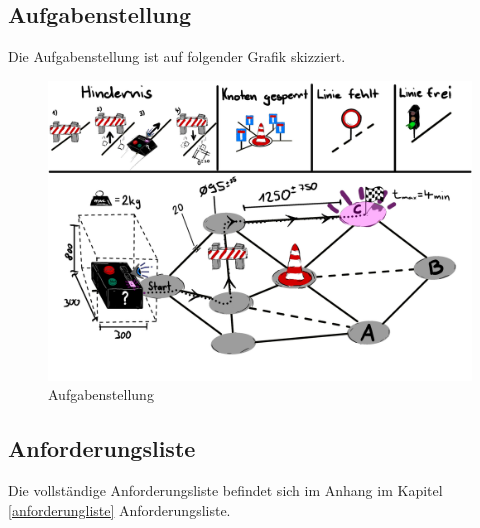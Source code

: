 \subsection{Aufgabenstellung}

Die Aufgabenstellung ist auf folgender Grafik skizziert.

\begin{figure}[H]
\centering
\includegraphics[width=\textwidth]{img/Skizze_Aufgabenstellung_v4.2.png}
\caption{Aufgabenstellung}
\label{fig:aufgebanstellung}
\end{figure}

\subsection{Anforderungsliste}

Die vollständige Anforderungsliste befindet sich im Anhang im Kapitel \ref{anforderungliste} Anforderungsliste.